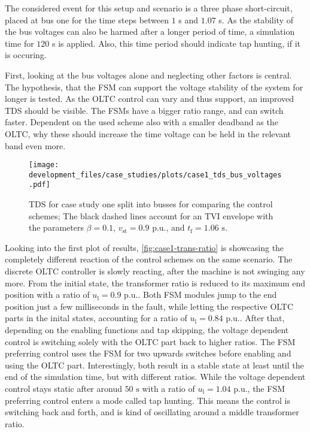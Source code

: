 The considered event for this setup and scenario is a three phase short-circuit, placed at bus one for the time steps between $1$ s and $1.07$ s.
As the stability of the bus voltages can also be harmed after a longer period of time, a simulation time for $120$ s is applied.
Also, this time period should indicate tap hunting, if it is occuring.

First, looking at the bus voltages alone and neglecting other factors is central.
The hypothesis, that the \acs{FSM} can support the voltage stability of the system for longer is tested.
As the \acs{OLTC} control can vary and thus support, an improved \acs{TDS} should be visible. 
The \acsp{FSM} have a bigger ratio range, and can switch faster.
Dependent on the used scheme also with a smaller deadband as the \acs{OLTC}, why these should increase the time voltage can be held in the relevant band even more.  

\begin{figure}[htbp!]
    \centering
    \texttt{[image: development\_files/case\_studies/plots/case1\_tds\_bus\_voltages.pdf]}
    \caption[\acs{TDS} for case study one split into busses for comparing the control schemes]{\acs{TDS} for case study one split into busses for comparing the control schemes; The black dashed lines account for an \acs{TVI} envelope with the parameters $\beta=0.1$,  $v_\mathrm{st}=0.9\text{ p.u.}$, and $t_\mathrm{f}=1.06\text{ s}$.}
    \label{fig:case1-voltages}
\end{figure}

{}
Looking into the first plot of results, \autoref{fig:case1-trans-ratio} is showcasing the completely different reaction of the control schemes on the same scenario.
The discrete \acs{OLTC} controller is slowly reacting, after the machine is not swinging any more.
From the initial state, the transformer ratio is reduced to its maximum end position with a ratio of $u_\mathrm{l}=0.9\text{ p.u.}$.
Both \acs{FSM} modules jump to the end position just a few milliseconds in the fault, while letting the respective \acs{OLTC} parts in the inital states, accounting for a ratio of $u_\mathrm{l}=0.84\text{ p.u.}$.
After that, depending on the enabling functions and tap skipping, the voltage dependent control is switching solely with the \acs{OLTC} part back to higher ratios.
The \acs{FSM} preferring control uses the \acs{FSM} for two upwards switches before enabling and using the \acs{OLTC} part.
Interestingly, both result in a stable state at least until the end of the simulation time, but with different ratios.
While the voltage dependent control stays static after aronud $50\text{ s}$ with a ratio of $u_\mathrm{l}=1.04\text{ p.u.}$, the \acs{FSM} preferring control enters a mode called tap hunting.
This means the control is switching back and forth, and is kind of oscillating around a middle transformer ratio.

